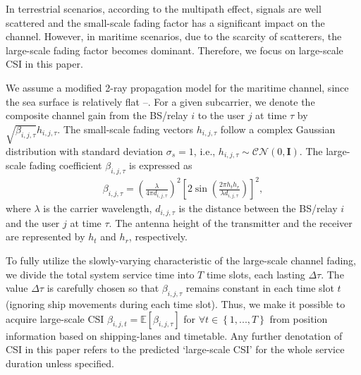 \documentclass[journal]{IEEEtran}
\begin{document}
 In terrestrial scenarios, according to the multipath effect, signals are well scattered and the small-scale fading factor has a significant impact on the channel. However, in maritime scenarios, due to the scarcity of scatterers, the large-scale fading factor becomes dominant. Therefore, we focus on large-scale CSI in this paper. 
 
 We assume a modified 2-ray propagation model for the maritime channel, since the sea surface is relatively flat \cite{p0}--\cite{p2}. For a given subcarrier, we denote the composite channel gain from the BS/relay $i$ to the user $j$ at time $\tau $ by $\sqrt {{\beta _{i,j,\tau }}} {h_{i,j,\tau }}$. The small-scale fading vectors ${h_{i,j,\tau }}$ follow a complex Gaussian distribution with standard deviation ${\sigma _s} = 1$, i.e., ${h_{i,j,\tau }} \sim \mathcal{CN}(0, \mathbf{I})$. The large-scale fading coefficient ${\beta _{i,j,\tau }}$ is expressed as
 \begin{align}
 {\beta _{i,j,\tau }} = {\left( {\frac{\lambda }{{4\pi {d_{i,j,\tau }}}}} \right)^2}{\left[ {2\sin \left( {\frac{{2\pi {h_t}{h_r}}}{{\lambda {d_{i,j,\tau }}}}} \right)} \right]^2} ,
 \end{align}
 where $\lambda $ is the carrier wavelength, ${d_{i,j,\tau }}$ is the distance between the BS/relay $i$ and the user $j$ at time $\tau $. The antenna height of the transmitter and the receiver are represented by $h_t$ and $h_r$, respectively. 
 
 To fully utilize the slowly-varying characteristic of the large-scale channel fading, we divide the total system service time into $T$ time slots, each lasting $\Delta \tau$. The value $\Delta \tau$ is carefully chosen so that $\beta _{i,j,\tau }$ remains constant in each time slot $t$ (ignoring ship movements during each time slot). Thus, we make it possible to acquire large-scale CSI $\beta _{i,j,t} = \mathbb{E} \left [ {\beta _{i,j,\tau }} \right ]$ for $\forall t \in \left\{ {1,...,T} \right\}$ from position information based on shipping-lanes and timetable. Any further denotation of CSI in this paper refers to the predicted `large-scale CSI' for the whole service duration unless specified. 
\end{document}
